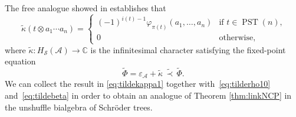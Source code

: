 \documentclass[pdftex]{sigma}%
\numberwithin{equation}{section}
\newcommand{\A}{\mathcal{A}}
\newcommand{\cHS}{H_\mathcal{S}}
\begin{document}
\begin{Remark}
The free analogue showed in \cite{JMNT} establishes that
\begin{equation}
\label{eq:tildekappa1}
	\tilde\kappa(t \otimes a_1\cdots a_n)
	= \begin{cases} (-1)^{i(t)-1}\varphi_{\pi(t)}(a_1,\dots,a_n) & \text{if $t\in \operatorname{PST}(n)$,}\\ 0& \text{otherwise}, \end{cases}
\end{equation}
where $\tilde\kappa\colon \cHS(\A)\to\mathbb{C}$ is the infinitesimal character satisfying the fixed-point equation
\[\tilde\Phi = \varepsilon_\A + \tilde\kappa \,\tilde\prec\, \tilde\Phi.\]
We can collect the result in \eqref{eq:tildekappa1} together with~\eqref{eq:tilderho10} and~\eqref{eq:tildebeta} in order to obtain an analogue of Theorem \ref{thm:linkNCP} in the unshuffle bialgebra of Schr\"oder trees.
\end{Remark}
\end{document}
